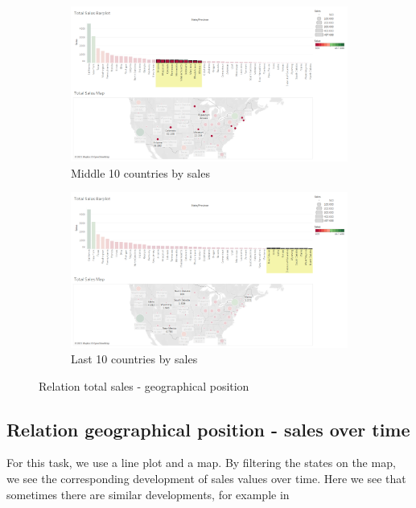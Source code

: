 \documentclass[openany]{article}
\begin{document}
\begin{figure}[h]\ContinuedFloat
	\begin{subfigure}{\textwidth}
		\centering
		\includegraphics[width=\linewidth]{Tableau/a_3}
		\caption{Middle 10 countries by sales}
	\end{subfigure}

	\begin{subfigure}{\textwidth}
		\centering
		\includegraphics[width=\linewidth]{Tableau/a_1}
		\caption{Last 10 countries by sales}
	\end{subfigure}
	\caption{Relation total sales - geographical position}
\end{figure}

\clearpage
\subsection{Relation geographical position - sales over time}

For this task, we use a line plot and a map.
By filtering the states on the map, we see the corresponding development of sales values over time.
Here we see that sometimes there are similar developments, for example in 
\end{document}
